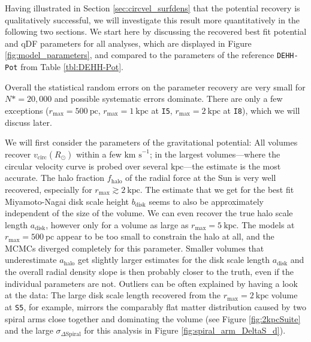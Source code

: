 \documentclass[iop,revtex4,numberedappendix,appendixfloats]{emulateapj}
\begin{document}
Having illustrated in Section \ref{sec:circvel_surfdens} that the potential recovery is qualitatively successful, we will investigate this result more quantitatively in the following two sections. We start here by discussing the recovered best fit potential and qDF parameters for all analyses, which are displayed in Figure \ref{fig:model_parameters}, and compared to the parameters of the reference \texttt{DEHH-Pot} from Table \ref{tbl:DEHH-Pot}. 

Overall the statistical random errors on the parameter recovery are very small for $N*=20,000$ and possible systematic errors dominate. There are only a few exceptions ($r_\text{max}=500~\text{pc}$, $r_\text{max}=1~\text{kpc}$ at \texttt{I5}, $r_\text{max}=2~\text{kpc}$ at \texttt{I8}), which we will discuss later.

We will first consider the parameters of the gravitational potential: All volumes recover $v_\text{circ}(R_\odot)$ within a few $\text{km s}^{-1}$; in the largest volumes---where the circular velocity curve is probed over several $\text{kpc}$---the estimate is the most accurate. The halo fraction $f_\text{halo}$ of the radial force at the Sun is very well recovered, especially for $r_\text{max}\gtrsim 2~\text{kpc}$. The estimate that we get for the best fit Miyamoto-Nagai disk scale height $b_\text{disk}$ seems to also be approximately independent of the size of the volume. We can even recover the true halo scale length $a_\text{disk}$, however only for a volume as large as $r_\text{max}=5~\text{kpc}$. The models at $r_\text{max}=500~\text{pc}$ appear to be too small to constrain the halo at all, and the MCMCs diverged completely for this parameter. Smaller volumes that underestimate $a_\text{halo}$ get slightly larger estimates for the disk scale length $a_\text{disk}$ and the overall radial density slope is then probably closer to the truth, even if the individual parameters are not. Outliers can be often explained by having a look at the data: The large disk scale length recovered from the $r_\text{max}=2~\text{kpc}$ volume at \texttt{S5}, for example, mirrors the comparably flat matter distribution caused by two spiral arms close together and dominating the volume (see Figure \ref{fig:2kpcSuite} and the large $\sigma_{\Delta\text{Spiral}}$ for this analysis in Figure \ref{fig:spiral_arm_DeltaS_d}). 
\end{document}
